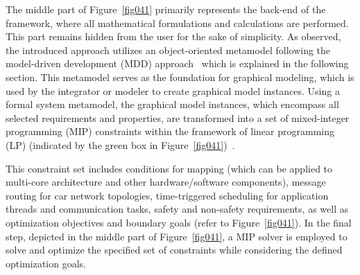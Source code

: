     The middle part of Figure~\ref{fig041} primarily represents the back-end of the framework, where all mathematical formulations and calculations are performed. This part remains hidden from the user for the sake of simplicity. As observed, the introduced approach utilizes an object-oriented metamodel following the model-driven development (MDD) approach~\cite{selic2003pragmatics} which is explained in the following section. This metamodel serves as the foundation for graphical modeling, which is used by the integrator or modeler to create graphical model instances. Using a formal system metamodel, the graphical model instances, which encompass all selected requirements and properties, are transformed into a set of mixed-integer programming (MIP) constraints within the framework of linear programming (LP) (indicated by the green box in Figure~\ref{fig041})~\cite{vanderbei2020linear, floudas2005mixed}.



    
    
    This constraint set includes conditions for mapping (which can be applied to multi-core architecture and other hardware/software components), message routing for car network topologies, time-triggered scheduling for application threads and communication tasks, safety and non-safety requirements, as well as optimization objectives and boundary goals (refer to Figure~\ref{fig041}). In the final step, depicted in the middle part of Figure~\ref{fig041}, a MIP solver is employed to solve and optimize the specified set of constraints while considering the defined optimization goals.
    
